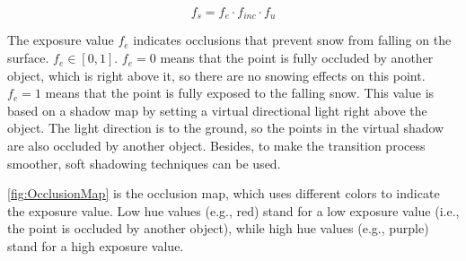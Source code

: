 \documentclass{article}
\begin{document}
\[
  f_{s} = f_{e} \cdot f_{inc} \cdot f_{u}
\]

The exposure value \( f_{e} \) indicates occlusions that prevent snow from falling on the surface. %
\( f_{e} \in [0, 1] \). \( f_{e}=0 \) means that the point is fully occluded by another object, which is right 
above it, so there are no snowing effects on this point. \( f_{e}=1 \) means that the point is fully exposed to the 
falling snow. This value is based on a shadow map by setting a virtual directional light right above the object. 
The light direction is to the ground, so the points in the virtual shadow are also occluded by another object. 
Besides, to make the transition process smoother, soft shadowing techniques can be used. 

\ref{fig:OcclusionMap} is the occlusion map, which uses different colors to indicate the exposure value. Low hue 
values (e.g., red) stand for a low exposure value (i.e., the point is occluded by another object), while high hue
values (e.g., purple) stand for a high exposure value.
\end{document}
